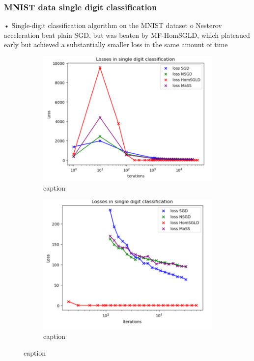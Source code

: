 \documentclass{article}
\begin{document}
\subsubsection{MNIST data single digit classification}\label{sec: single digit classification}
•	Single-digit classification algorithm on the MNIST dataset
o	Nesterov acceleration beat plain SGD, but was beaten by MF-HomSGLD, which plateaued early but achieved a substantially smaller loss in the same amount of time
     \begin{figure}[H]
 \begin{subfigure}{0.5\textwidth}
   \centering
   \includegraphics[width=0.8\linewidth]{images/Spiliopoulos2019-SGD-algos-single-digit classification.png}
   \caption{ caption}
   \label{fig: description}
 \end{subfigure}%
 \begin{subfigure}{0.5\textwidth}
   \centering
   \includegraphics[width=0.8\linewidth]{images/Spiliopoulos2019-SGD-algos-single-digit-late-time.png}
   \caption{ caption}
   \label{fig:  description}
 \end{subfigure}
 \caption{ caption}
 \label{fig:  label}
 \end{figure} 
\end{document}
